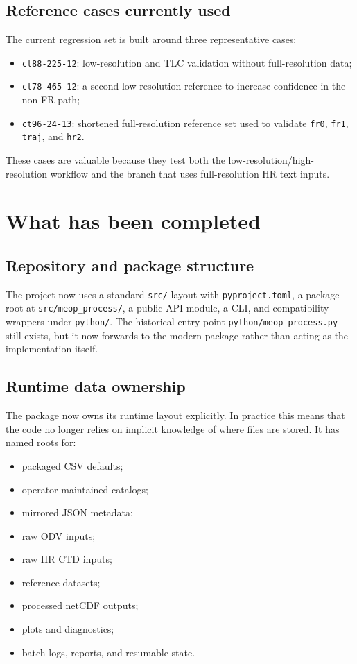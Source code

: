 \documentclass[11pt,a4paper]{article}
\newcommand{\pkg}[1]{\texttt{#1}}
\begin{document}
\subsection{Reference cases currently used}

The current regression set is built around three representative cases:

\begin{itemize}[leftmargin=1.5em]
  \item \pkg{ct88-225-12}: low-resolution and TLC validation without full-resolution data;
  \item \pkg{ct78-465-12}: a second low-resolution reference to increase confidence in the non-FR path;
  \item \pkg{ct96-24-13}: shortened full-resolution reference set used to validate \pkg{fr0}, \pkg{fr1}, \pkg{traj}, and \pkg{hr2}.
\end{itemize}

These cases are valuable because they test both the low-resolution/high-resolution workflow and the branch that uses full-resolution HR text inputs.

\section{What has been completed}

\subsection{Repository and package structure}

The project now uses a standard \pkg{src/} layout with \pkg{pyproject.toml}, a package root at \pkg{src/meop\_process/}, a public API module, a CLI, and compatibility wrappers under \pkg{python/}. The historical entry point \pkg{python/meop\_process.py} still exists, but it now forwards to the modern package rather than acting as the implementation itself.

\subsection{Runtime data ownership}

The package now owns its runtime layout explicitly. In practice this means that the code no longer relies on implicit knowledge of where files are stored. It has named roots for:

\begin{itemize}[leftmargin=1.5em]
  \item packaged CSV defaults;
  \item operator-maintained catalogs;
  \item mirrored JSON metadata;
  \item raw ODV inputs;
  \item raw HR CTD inputs;
  \item reference datasets;
  \item processed netCDF outputs;
  \item plots and diagnostics;
  \item batch logs, reports, and resumable state.
\end{itemize}
\end{document}
